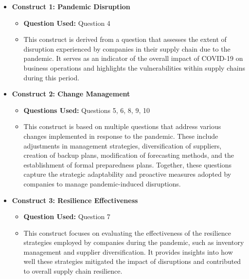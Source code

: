 \begin{itemize}

    \item \textbf{Construct 1: Pandemic Disruption}
    \begin{itemize}
        \item \textbf{Question Used:} Question 4
        \item This construct is derived from a question that assesses the extent of disruption experienced by companies in their supply chain due to the pandemic. It serves as an indicator of the overall impact of COVID-19 on business operations and highlights the vulnerabilities within supply chains during this period.
    \end{itemize}

    \item \textbf{Construct 2: Change Management}
    \begin{itemize}
        \item \textbf{Questions Used:} Questions 5, 6, 8, 9, 10
        \item This construct is based on multiple questions that address various changes implemented in response to the pandemic. These include adjustments in management strategies, diversification of suppliers, creation of backup plans, modification of forecasting methods, and the establishment of formal preparedness plans. Together, these questions capture the strategic adaptability and proactive measures adopted by companies to manage pandemic-induced disruptions.
    \end{itemize}

    \item \textbf{Construct 3: Resilience Effectiveness}
    \begin{itemize}
        \item \textbf{Question Used:} Question 7
        \item This construct focuses on evaluating the effectiveness of the resilience strategies employed by companies during the pandemic, such as inventory management and supplier diversification. It provides insights into how well these strategies mitigated the impact of disruptions and contributed to overall supply chain resilience.
    \end{itemize}

\end{itemize}


